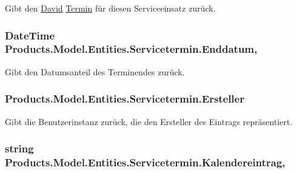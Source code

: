 Gibt den \hyperlink{namespace_david}{David} \hyperlink{class_products_1_1_model_1_1_entities_1_1_termin}{Termin} für diesen Serviceeinsatz zurück. 

\subsubsection[{\texorpdfstring{Enddatum}{Enddatum}}]{\setlength{\rightskip}{0pt plus 5cm}Date\+Time Products.\+Model.\+Entities.\+Servicetermin.\+Enddatum\hspace{0.3cm}{\ttfamily [get]}, {\ttfamily [set]}}\hypertarget{class_products_1_1_model_1_1_entities_1_1_servicetermin_a8833882ddb322b509cb73b0cf2f44f65}{}\label{class_products_1_1_model_1_1_entities_1_1_servicetermin_a8833882ddb322b509cb73b0cf2f44f65}


Gibt den Datumsanteil des Terminendes zurück. 

\subsubsection[{\texorpdfstring{Ersteller}{Ersteller}}]{ Products.\+Model.\+Entities.\+Servicetermin.\+Ersteller\hspace{0.3cm}{\ttfamily [get]}}\hypertarget{class_products_1_1_model_1_1_entities_1_1_servicetermin_afaeb62c182e10b5e4dfd438fb6b3e7bf}{}\label{class_products_1_1_model_1_1_entities_1_1_servicetermin_afaeb62c182e10b5e4dfd438fb6b3e7bf}


Gibt die Benutzerinstanz zurück, die den Ersteller des Eintrags repräsentiert. 

\subsubsection[{\texorpdfstring{Kalendereintrag}{Kalendereintrag}}]{\setlength{\rightskip}{0pt plus 5cm}string Products.\+Model.\+Entities.\+Servicetermin.\+Kalendereintrag\hspace{0.3cm}{\ttfamily [get]}, {\ttfamily [set]}}\hypertarget{class_products_1_1_model_1_1_entities_1_1_servicetermin_a91d8b5cfe730f3af79c023dd5ad21659}{}\label{class_products_1_1_model_1_1_entities_1_1_servicetermin_a91d8b5cfe730f3af79c023dd5ad21659}


